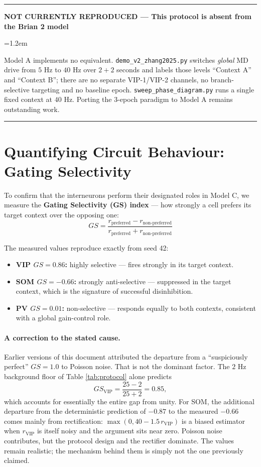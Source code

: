 \documentclass[11pt,a4paper]{article}
\newenvironment{gapbox}[1]{%
  \par\medskip\noindent
  \textcolor{gapred}{\rule{\linewidth}{1.1pt}}\par\nobreak\vspace{2pt}%
  \noindent\textcolor{gapred}{\textbf{NOT CURRENTLY REPRODUCED --- #1}}%
  \par\nobreak\vspace{3pt}%
  \begingroup\leftskip=1.2em\relax\small
}{%
  \par\endgroup\vspace{3pt}%
  \noindent\textcolor{gapred}{\rule{\linewidth}{0.5pt}}\par\medskip
}
\begin{document}
\begin{gapbox}{This protocol is absent from the Brian 2 model}
Model A implements no equivalent. \texttt{demo\_v2\_zhang2025.py} switches
\emph{global} MD drive from $5$ Hz to $40$ Hz over $2 + 2$ seconds and labels those
levels ``Context A'' and ``Context B''; there are no separate VIP-1/VIP-2 channels, no
branch-selective targeting and no baseline epoch.
\texttt{sweep\_phase\_diagram.py} runs a single fixed context at $40$ Hz. Porting the
3-epoch paradigm to Model A remains outstanding work.
\end{gapbox}

\section{Quantifying Circuit Behaviour: Gating Selectivity}
\label{sec:gs}
To confirm that the interneurons perform their designated roles in Model C, we measure
the \textbf{Gating Selectivity (GS) index} --- how strongly a cell prefers its target
context over the opposing one:
\begin{equation}
    GS = \frac{r_{\text{preferred}} - r_{\text{non-preferred}}}
              {r_{\text{preferred}} + r_{\text{non-preferred}}}
\end{equation}

The measured values reproduce exactly from seed 42:
\begin{itemize}
    \item \textbf{VIP $GS = 0.86$:} highly selective --- fires strongly in its target
      context.
    \item \textbf{SOM $GS = -0.66$:} strongly anti-selective --- suppressed in the
      target context, which is the signature of successful disinhibition.
    \item \textbf{PV $GS = 0.01$:} non-selective --- responds equally to both contexts,
      consistent with a global gain-control role.
\end{itemize}

\paragraph{A correction to the stated cause.}
Earlier versions of this document attributed the departure from a ``suspiciously
perfect'' $GS = 1.0$ to Poisson noise. That is not the dominant factor. The
$2$ Hz background floor of Table \ref{tab:protocol} alone predicts
\begin{equation}
    GS_{\text{VIP}} = \frac{25 - 2}{25 + 2} = 0.85,
\end{equation}
which accounts for essentially the entire gap from unity. For SOM, the additional
departure from the deterministic prediction of $-0.87$ to the measured $-0.66$ comes
mainly from rectification: $\max(0, 40 - 1.5\,r_{\text{VIP}})$ is a biased estimator
when $r_{\text{VIP}}$ is itself noisy and the argument sits near zero. Poisson noise
contributes, but the protocol design and the rectifier dominate. The values remain
realistic; the mechanism behind them is simply not the one previously claimed.
\end{document}
